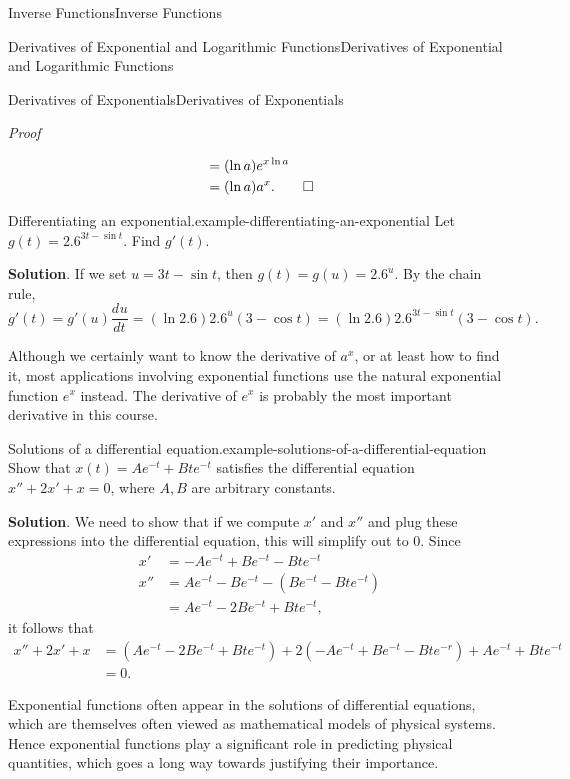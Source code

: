 \documentclass[10pt,]{book}
\makeatletter
\renewcommand*{\proofname}{Proof}
\renewenvironment{proof}[1][\proofname]{\par
  \pushQED{\qed}%
  \normalfont \topsep6\p@\@plus6\p@\relax
  \trivlist
  \item\relax
    {\itshape
    #1\@addpunct{.}}\hspace\labelsep\ignorespaces
}{%
  \popQED\endtrivlist\@endpefalse
}
\numberwithin{equation}{section}
\newcommand{\dv}[3][]{\dfrac{d^{#1} #2}{d #3^{#1}}}
\makeatother
\begin{document}
\begin{chapterptx}{Inverse Functions}{}{Inverse Functions}{}{}
\begin{sectionptx}{Derivatives of Exponential and Logarithmic Functions}{}{Derivatives of Exponential and Logarithmic Functions}{}{}
\begin{subsectionptx}{Derivatives of Exponentials}{}{Derivatives of Exponentials}{}{}
\begin{proof}
\begin{align*}
& = (\ln a)e^{x\ln a} \\
& = (\ln a)a^{x}. \qedhere
\end{align*}
%
\end{proof}
\begin{example}{Differentiating an exponential.}{example-differentiating-an-exponential}%
\hypertarget{p-229}{}%
Let \(g(t) = 2.6^{3t - \sin t}\). Find \(g'(t)\).%
\par\smallskip%
\noindent\textbf{Solution}.\hypertarget{solution-49}{}\quad%
\hypertarget{p-230}{}%
If we set \(u = 3t - \sin t\), then \(g(t) = g(u) = 2.6^{u}\). By the chain rule, \(g'(t) = g'(u)\dv{u}{t} = (\ln2.6)2.6^{u}(3-\cos t) = (\ln2.6)2.6^{3t-\sin t}(3-\cos t).\)%
\end{example}
\hypertarget{p-231}{}%
Although we certainly want to know the derivative of \(a^{x}\), or at least how to find it, most applications involving exponential functions use the natural exponential function \(e^{x}\) instead. The derivative of \(e^{x}\) is probably the most important derivative in this course.%
\begin{example}{Solutions of a differential equation.}{example-solutions-of-a-differential-equation}%
\hypertarget{p-232}{}%
Show that \(x(t) = Ae^{-t} + Bte^{-t}\) satisfies the differential equation \(x'' + 2x' + x = 0\), where \(A,B\) are arbitrary constants.%
\par\smallskip%
\noindent\textbf{Solution}.\hypertarget{solution-50}{}\quad%
\hypertarget{p-233}{}%
We need to show that if we compute \(x'\) and \(x''\) and plug these expressions into the differential equation, this will simplify out to \(0\). Since%
\begin{align*}
x' & = -Ae^{-t} +Be^{-t} - Bte^{-t} \\
x'' & = Ae^{-t} - Be^{-t} - (Be^{-t} - Bte^{-t}) \\
& = Ae^{-t} - 2Be^{-t} + Bte^{-t}, 
\end{align*}
it follows that%
\begin{align*}
x'' + 2x' + x & = (Ae^{-t} - 2Be^{-t} + Bte^{-t}) + 2(-Ae^{-t} + Be^{-t} - Bte^{-r}) + Ae^{-t} + Bte^{-t} \\
& = 0. 
\end{align*}
%
\end{example}
\hypertarget{p-234}{}%
Exponential functions often appear in the solutions of differential equations, which are themselves often viewed as mathematical models of physical systems. Hence exponential functions play a significant role in predicting physical quantities, which goes a long way towards justifying their importance.%

\end{subsectionptx}
\end{sectionptx}
\end{chapterptx}
\end{document}

